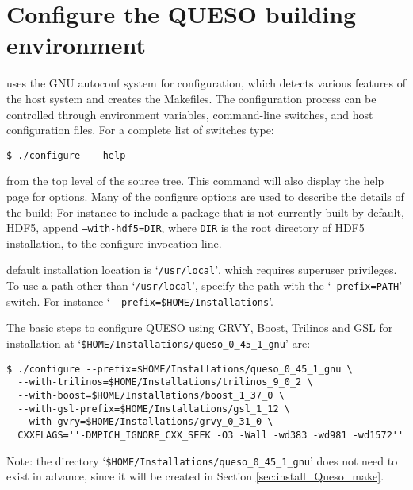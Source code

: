 \section{Configure the QUESO building environment}\label{sec:Queso_configure}
\Queso{} uses the GNU autoconf system for configuration, which detects various features of the host system and creates the Makefiles. %
%  
% 
The configuration process can be controlled through environment variables, command-line switches, and host configuration files.
For a complete list of switches type:
\begin{verbatim}
$ ./configure  --help       
\end{verbatim}
%
from the top level of the source tree. This command will also display the help page for \Queso{} options.%
 Many of the \Queso{} configure options are used to describe the details of the build; For instance to include a package that is not currently built by default, HDF5, append \texttt{--with-hdf5=DIR}, where \texttt{DIR} is the root directory of HDF5 installation,  to the configure invocation line. 

 \Queso{} default installation location is `\texttt{/usr/local}', which requires superuser privileges. To use a path
        other than `\texttt{/usr/local}', specify the path with the `\texttt{--prefix=PATH}' switch. For instance `\verb+--prefix=$HOME/Installations+'.



The basic steps to configure QUESO using GRVY, Boost, Trilinos and GSL for installation at `\verb+$HOME/Installations/queso_0_45_1_gnu+' are:
\begin{verbatim}
$ ./configure --prefix=$HOME/Installations/queso_0_45_1_gnu \
  --with-trilinos=$HOME/Installations/trilinos_9_0_2 \
  --with-boost=$HOME/Installations/boost_1_37_0 \
  --with-gsl-prefix=$HOME/Installations/gsl_1_12 \
  --with-gvry=$HOME/Installations/grvy_0_31_0 \
  CXXFLAGS=''-DMPICH_IGNORE_CXX_SEEK -O3 -Wall -wd383 -wd981 -wd1572''
\end{verbatim}

Note: the directory `\verb+$HOME/Installations/queso_0_45_1_gnu+' does not need to exist in advance, since it will be created in Section \ref{sec:install_Queso_make}.



